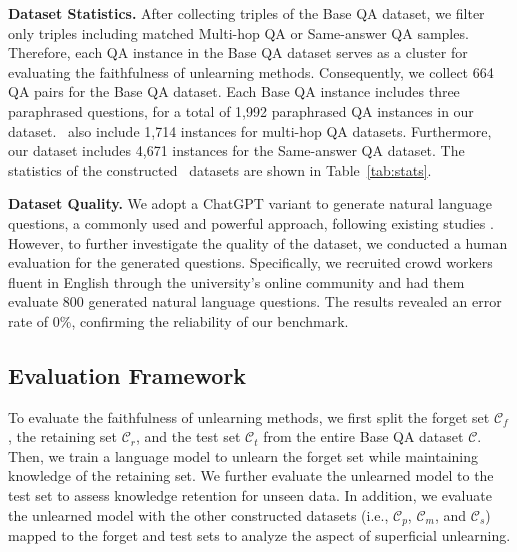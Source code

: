 \noindent\textbf{Dataset Statistics.}
After collecting triples of the Base QA dataset, we filter only triples including matched Multi-hop QA or Same-answer QA samples.
Therefore, each QA instance in the Base QA dataset serves as a cluster for evaluating the faithfulness of unlearning methods.
Consequently, we collect 664 QA pairs for the Base QA dataset.
Each Base QA instance includes three paraphrased questions, for a total of 1,992 paraphrased QA instances in our dataset.
\ourdata~also include 1,714 instances for multi-hop QA datasets. %
Furthermore, our dataset includes 4,671 instances for the Same-answer QA dataset.
The statistics of the constructed \ourdata~datasets are shown in Table~\ref{tab:stats}.





\noindent\textbf{Dataset Quality.}
We adopt a ChatGPT variant to generate natural language questions, a commonly used and powerful approach, following existing studies \citep{shi2024muse, jin2024rwku, maini2024tofu}.
However, to further investigate the quality of the dataset, we conducted a human evaluation for the generated questions.
Specifically, we recruited crowd workers fluent in English through the university’s online community and had them evaluate 800 generated natural language questions. The results revealed an error rate of 0\%, confirming the reliability of our benchmark.






\subsection{Evaluation Framework}
\label{bench:eval_framework}
To evaluate the faithfulness of unlearning methods, we first split the forget set $\mathcal{C}_{f}$, the retaining set $\mathcal{C}_{r}$, and the test set $\mathcal{C}_{t}$ from the entire Base QA dataset $\mathcal{C}$.
Then, we train a language model to unlearn the forget set while maintaining knowledge of the retaining set.
We further evaluate the unlearned model to the test set to assess knowledge retention for unseen data.
In addition, we evaluate the unlearned model with the other constructed datasets (i.e., $\mathcal{C}_{p}$, $\mathcal{C}_{m}$, and $\mathcal{C}_{s}$) mapped to the forget and test sets to analyze the aspect of superficial unlearning.


